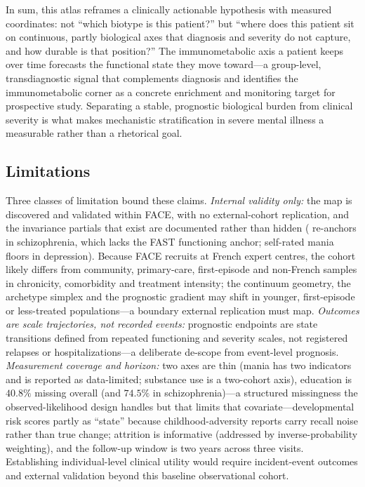 In sum, this atlas reframes a clinically actionable hypothesis with measured
coordinates: not ``which biotype is this patient?'' but ``where does this patient sit
on continuous, partly biological axes that diagnosis and severity do not capture, and
how durable is that position?'' The immunometabolic axis a patient keeps over time forecasts the functional state they move toward---a group-level, transdiagnostic signal that complements diagnosis and identifies the immunometabolic corner as a concrete enrichment and monitoring target for prospective study. Separating a stable, prognostic biological burden from clinical severity is what makes mechanistic stratification in severe mental illness a measurable rather than a rhetorical goal.

\subsection*{Limitations}

Three classes of limitation bound these claims. \emph{Internal validity only:} the map
is discovered and validated within FACE, with no external-cohort replication, and the
invariance partials that exist are documented rather than hidden (\Gfac{} re-anchors in
schizophrenia, which lacks the FAST functioning anchor; self-rated mania floors in
depression). Because FACE recruits at French expert centres, the cohort likely differs from
community, primary-care, first-episode and non-French samples in chronicity, comorbidity and
treatment intensity; the continuum geometry, the archetype simplex and the prognostic gradient
may shift in younger, first-episode or less-treated populations---a boundary external
replication must map.
\emph{Outcomes are scale trajectories, not recorded events:} prognostic endpoints are
state transitions defined from repeated functioning and severity scales, not registered
relapses or hospitalizations---a deliberate de-scope from event-level prognosis.
\emph{Measurement coverage and
horizon:} two axes are thin (mania has two indicators and is reported as data-limited;
substance use is a two-cohort axis), education is $40.8\%$ missing overall (and $74.5\%$
in schizophrenia)---a structured missingness the observed-likelihood design handles but
that limits that covariate---developmental risk scores partly as ``state'' because childhood-adversity reports carry recall noise rather than true change; attrition is informative (addressed by inverse-probability weighting), and the follow-up window is
two years across three visits. Establishing individual-level clinical utility
would require incident-event outcomes and external validation beyond this baseline
observational cohort.

